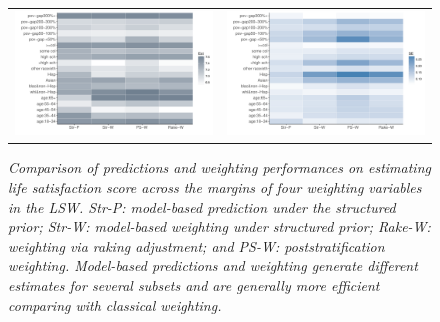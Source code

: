 \documentclass[11pt]{article}
\numberwithin{figure}{section}
\numberwithin{table}{section}
\numberwithin{equation}{section}
\begin{document}
 \begin{figure} \centering \begin{tabular}{cc}
 \includegraphics[width=.475\textwidth]{plot/lsw_mar_est.pdf}&\includegraphics[width=.475\textwidth]{plot/lsw_mar_se.pdf}
 \end{tabular} \caption{\em Comparison of predictions and weighting
  performances on estimating life satisfaction score across the margins of four
  weighting variables in the LSW. Str-P: model-based prediction under the
  structured prior; Str-W: model-based weighting under structured prior;
  Rake-W: weighting via raking adjustment; and PS-W: poststratification
  weighting. Model-based predictions and weighting generate different estimates
  for several subsets and are generally more efficient comparing with classical
  weighting.} \label{lsw-mar} \end{figure} 
\end{document}
